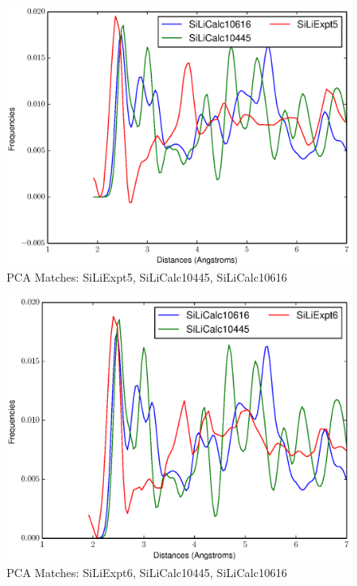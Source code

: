 \documentclass[12pt,letterpaper]{article}
\begin{document}
\begin{figure}[ht]
  \begin{center}
    \includegraphics[scale=0.8]{figs/PC10MatchSiLiExpt5-SiLiCalc10445-SiLiCalc10616.eps}
    \caption{PCA Matches: SiLiExpt5, SiLiCalc10445, SiLiCalc10616}
  \end{center}
\end{figure}

\begin{figure}[ht]
  \begin{center}
    \includegraphics[scale=0.8]{figs/PC10MatchSiLiExpt6-SiLiCalc10445-SiLiCalc10616.eps}
    \caption{PCA Matches: SiLiExpt6, SiLiCalc10445, SiLiCalc10616}
  \end{center}
\end{figure}
\end{document}
